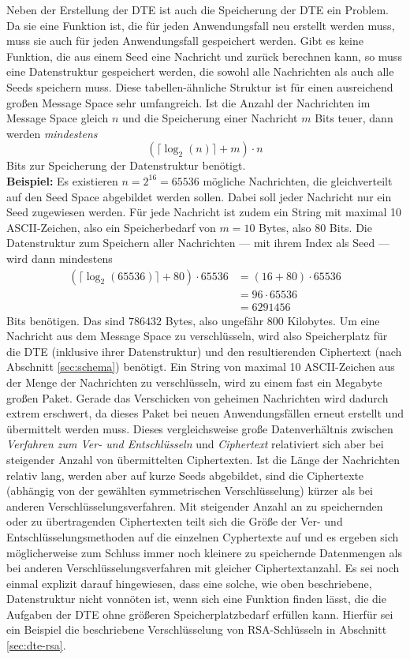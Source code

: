 Neben der Erstellung der DTE ist auch die Speicherung der DTE ein Problem. Da sie eine Funktion ist, die für jeden Anwendungsfall neu erstellt werden muss, muss sie auch für jeden Anwendungsfall gespeichert werden. Gibt es keine Funktion, die aus einem Seed eine Nachricht und zurück berechnen kann, so muss eine Datenstruktur gespeichert werden, die sowohl alle Nachrichten als auch alle Seeds speichern muss. Diese tabellen-ähnliche Struktur ist für einen ausreichend großen Message Space sehr umfangreich. Ist die Anzahl der Nachrichten im Message Space gleich $n$ und die Speicherung einer Nachricht $m$ Bits teuer, dann werden \emph{mindestens}
$$(\lceil\log_2(n)\rceil + m) \cdot n$$
Bits zur Speicherung der Datenstruktur benötigt.\\
\textbf{Beispiel:} Es existieren $n = 2^{16} = 65536$ mögliche Nachrichten, die gleichverteilt auf den Seed Space abgebildet werden sollen. Dabei soll jeder Nachricht nur ein Seed zugewiesen werden. Für jede Nachricht ist zudem ein String mit maximal 10 ASCII-Zeichen, also ein Speicherbedarf von $m = 10$ Bytes, also $80$ Bits. Die Datenstruktur zum Speichern aller Nachrichten --- mit ihrem Index als Seed --- wird dann mindestens
\begin{align*}
(\lceil\log_2(65536)\rceil + 80) \cdot 65536 &= (16 + 80) \cdot 65536\\
&= 96 \cdot 65536\\
&= 6 291 456
\end{align*}
Bits benötigen. Das sind $786 432$ Bytes, also ungefähr 800 Kilobytes. Um eine Nachricht aus dem Message Space zu verschlüsseln, wird also Speicherplatz für die DTE (inklusive ihrer Datenstruktur) und den resultierenden Ciphertext (nach Abschnitt \ref{sec:schema}) benötigt. Ein String von maximal 10 ASCII-Zeichen aus der Menge der Nachrichten zu verschlüsseln, wird zu einem fast ein Megabyte großen Paket. Gerade das Verschicken von geheimen Nachrichten wird dadurch extrem erschwert, da dieses Paket bei neuen Anwendungsfällen erneut erstellt und übermittelt werden muss. Dieses vergleichsweise große Datenverhältnis zwischen \emph{Verfahren zum Ver- und Entschlüsseln} und \emph{Ciphertext} relativiert sich aber bei steigender Anzahl von übermittelten Ciphertexten. Ist die Länge der Nachrichten relativ lang, werden aber auf kurze Seeds abgebildet, sind die Ciphertexte (abhängig von der gewählten symmetrischen Verschlüsselung) kürzer als bei anderen Verschlüsselungsverfahren. Mit steigender Anzahl an zu speichernden oder zu übertragenden Ciphertexten teilt sich die Größe der Ver- und Entschlüsselungsmethoden auf die einzelnen Cyphertexte auf und es ergeben sich möglicherweise zum Schluss immer noch kleinere zu speichernde Datenmengen als bei anderen Verschlüsselungsverfahren mit gleicher Ciphertextanzahl. Es sei noch einmal explizit darauf hingewiesen, dass eine solche, wie oben beschriebene, Datenstruktur nicht vonnöten ist, wenn sich eine Funktion finden lässt, die die Aufgaben der DTE ohne größeren Speicherplatzbedarf erfüllen kann. Hierfür sei ein Beispiel die beschriebene Verschlüsselung von RSA-Schlüsseln in Abschnitt \ref{sec:dte-rsa}.

